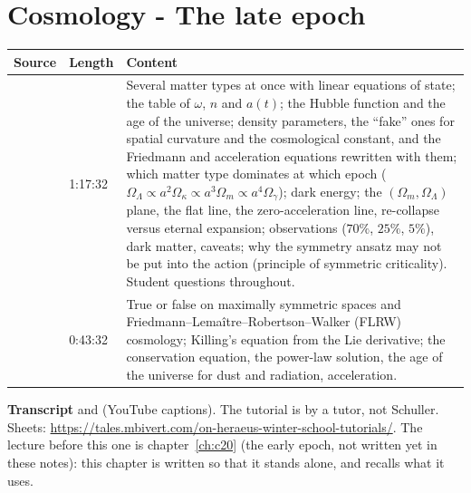 \chapter{Cosmology - The late epoch}\label{ch:c21}
\begin{paracol}{2}

\begin{sources}
\begin{tabularx}{\linewidth}{@{}l l L@{}}
\toprule
\textbf{Source} & \textbf{Length} & \textbf{Content}\\
\midrule
{} & 1:17:32 & Several matter types at once with linear equations of state; the table of $\omega$, $n$ and $a(t)$; the Hubble function and the age of the universe; density parameters, the ``fake'' ones for spatial curvature and the cosmological constant, and the Friedmann and acceleration equations rewritten with them; which matter type dominates at which epoch ($\Omega_\Lambda\propto a^2\Omega_\kappa\propto a^3\Omega_m\propto a^4\Omega_\gamma$); dark energy; the $(\Omega_m,\Omega_\Lambda)$ plane, the flat line, the zero-acceleration line, re-collapse versus eternal expansion; observations ($70\%$, $25\%$, $5\%$), dark matter, caveats; why the symmetry ansatz may not be put into the action (principle of symmetric criticality). Student questions throughout.\\
 & 0:43:32 & True or false on maximally symmetric spaces and Friedmann--Lema\^itre--Robertson--Walker (FLRW) cosmology; Killing's equation from the Lie derivative; the conservation equation, the power-law solution, the age of the universe for dust and radiation, acceleration.\\
\bottomrule
\end{tabularx}

\smallskip
\textbf{Transcript}  and  (YouTube captions). The tutorial is by a tutor, not Schuller. Sheets: \url{https://tales.mbivert.com/on-heraeus-winter-school-tutorials/}. The lecture before this one is chapter~\ref{ch:c20} (the early epoch, not written yet in these notes): this chapter is written so that it stands alone, and recalls what it uses.
\end{sources}


\end{paracol}
